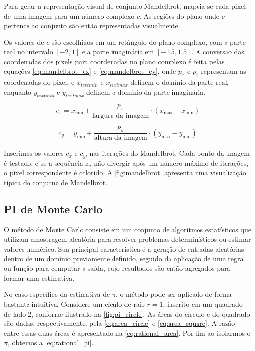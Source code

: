 Para gerar a representação visual do conjunto Mandelbrot, mapeia-se cada pixel de uma imagem para um número complexo $c$. As regiões do plano onde $c$ pertence ao conjunto são então representadas visualmente.

Os valores de $c$ são escolhidos em um retângulo do plano complexo, com a parte real no intervalo $[-2, 1]$ e a parte imaginária em $[-1.5, 1.5]$. A conversão das coordenadas dos pixels para coordenadas no plano complexo é feita pelas equações \autoref{eq:mandelbrot_cx} e \autoref{eq:mandelbrot_cy}, onde $p_x$ e $p_y$ representam as coordenadas do pixel, e $x_{text{min}}$ e $x_{text{max}}$ definem o domínio da parte real, enquanto $y_{text{min}}$ e $y_{text{max}}$ definem o domínio da parte imaginária.

\begin{equation}
	\label{eq:mandelbrot_cx}
	c_x = x_{\text{min}} + \frac{p_x}{\text{largura da imagem}} \cdot (x_{\text{max}} - x_{\text{min}})
\end{equation}

\begin{equation}
	\label{eq:mandelbrot_cy}
	c_y = y_{\text{min}} + \frac{p_y}{\text{altura da imagem}} \cdot (y_{\text{max}} - y_{\text{min}})
\end{equation}

Inserimos os valores $c_x$ e $c_y$, nas iterações do Mandelbrot. Cada ponto da imagem é testado, e se a sequência $z_n$ não divergir após um número máximo de iterações, o pixel correspondente é colorido. A \autoref{fig:mandelbrot} apresenta uma visualização típica do conjutno de Mandelbrot.

\subsection{PI de Monte Carlo}\label{subsec:pi}

O método de Monte Carlo consiste em um conjunto de algoritmos estatísticos que utilizam amostragem aleatória para resolver problemas determinísticos ou estimar valores numérico. Sua principal característica é a geração de entradas aleatórias dentro de um domínio previamente definido, seguido da aplicação de uma regra ou função para computar a saída, cujo resultados são então agregados para formar uma estimativa.

No caso específico da estimativa de $\pi$, o método pode ser aplicado de forma bastante intuitiva. Considere um cículo de raio $r = 1$, inscrito em um quadrado de lado $2$, conforme ilustrado na \autoref{fig:pi_circle}. As áreas do círculo e do quadrado são dadas, respectivamente, pela \autoref{eq:area_circle} e \autoref{eq:area_square}. A razão entre essas duas áreas é apresentado na \autoref{eq:rational_area}. Por fim ao isolarmos o $\pi$, obtemos a \autoref{eq:rational_pi}.

